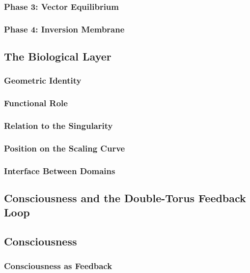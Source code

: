\documentclass[12pt]{article}
\begin{document}
\subsubsection{Phase 3: Vector Equilibrium}
\subsubsection{Phase 4: Inversion Membrane}


\subsection{The Biological Layer}

\subsubsection{Geometric Identity}
\subsubsection{Functional Role}
\subsubsection{Relation to the Singularity}
\subsubsection{Position on the Scaling Curve}
\subsubsection{Interface Between Domains}


\subsection{Consciousness and the Double-Torus Feedback Loop}
\subsection{Consciousness}

\subsubsection{Consciousness as Feedback}
\end{document}
